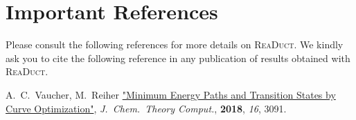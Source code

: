 \documentclass[]{tufte-book}
\begin{document}
\chapter{Important References}

Please consult the following references for more details on \textsc{ReaDuct}.
We kindly ask you to cite the following reference in any publication of results obtained with \textsc{ReaDuct}.
\vspace{1.0cm}

A.~C.~Vaucher, M.~Reiher \href{https://pubs.acs.org/doi/10.1021/acs.jctc.8b00169}{"Minimum Energy Paths and Transition States by Curve Optimization"}, \textit{J.~Chem.~Theory Comput.}, \textbf{2018}, \textit{16}, 3091.




\backmatter




\end{document}
